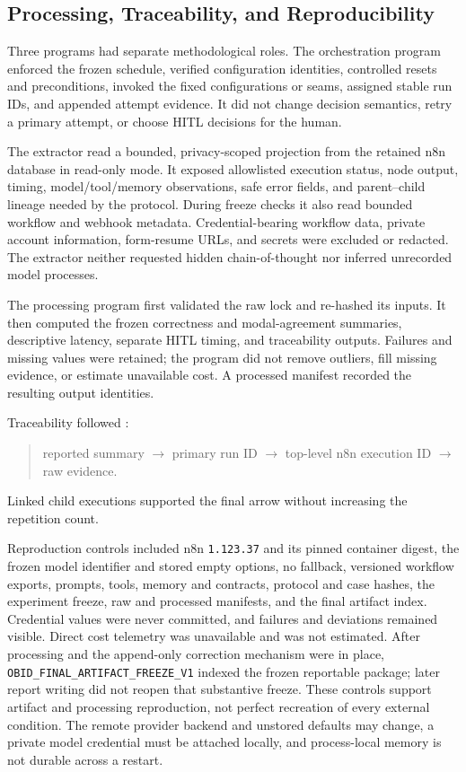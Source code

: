 \subsection[Processing, Traceability, and Reproducibility]{Processing,
Traceability, and\texorpdfstring{\newline}{ }
Reproducibility}\label{subsec:method-processing}

Three programs had separate methodological roles. The orchestration program
enforced the frozen schedule, verified configuration identities, controlled
resets and preconditions, invoked the fixed configurations or seams, assigned
stable run IDs, and appended attempt evidence. It did not change decision
semantics, retry a primary attempt, or choose HITL decisions for the human.

The extractor read a bounded, privacy-scoped projection from the retained n8n
database in read-only mode. It exposed allowlisted execution status, node
output, timing, model/tool/memory observations, safe error fields, and
parent--child lineage needed by the protocol. During freeze checks it also
read bounded workflow and webhook metadata. Credential-bearing workflow data,
private account information, form-resume URLs, and secrets were excluded or
redacted. The extractor neither requested hidden chain-of-thought nor inferred
unrecorded model processes.

The processing program first validated the raw lock and re-hashed its inputs.
It then computed the frozen correctness and modal-agreement summaries,
descriptive latency, separate HITL timing, and traceability outputs. Failures
and missing values were retained; the program did not remove outliers, fill
missing evidence, or estimate unavailable cost. A processed manifest recorded
the resulting output identities.

Traceability followed \cite{moreau2013provdm}:
\begin{quote}
\centering
\small
reported summary $\rightarrow$ primary run ID $\rightarrow$ top-level n8n
execution ID $\rightarrow$ raw evidence.
\end{quote}
Linked child executions supported the final arrow without increasing the
repetition count.

Reproduction controls included n8n \texttt{1.123.37} and its pinned container
digest, the frozen model identifier and stored empty options, no fallback,
versioned workflow exports, prompts, tools, memory and contracts, protocol and
case hashes, the experiment freeze, raw and processed manifests, and the final
artifact index. Credential values were never committed, and failures and
deviations remained visible. Direct cost telemetry was unavailable and was not
estimated. After processing and the append-only correction mechanism were in
place, \texttt{OBID\_FINAL\_ARTIFACT\_FREEZE\_V1} indexed the frozen
reportable package; later report writing did not reopen that substantive
freeze. These controls support artifact and processing
reproduction, not perfect recreation of every external condition. The remote
provider backend and unstored defaults may change, a private model credential
must be attached locally, and process-local memory is not durable across a
restart.

